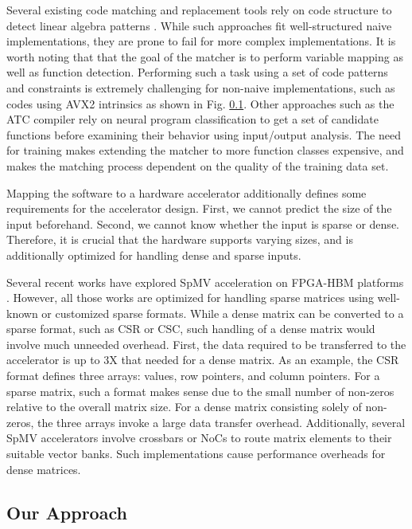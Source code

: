 \documentclass[manuscript,screen,review]{acmart}
\begin{document}
Several existing code matching and replacement tools rely on code structure to detect linear algebra patterns \cite{kernelfarer, IDL}. While such approaches fit well-structured naive implementations, they are prone to fail for more complex implementations. It is worth noting that that the goal of the matcher is to perform variable mapping as well as function detection. Performing such a task using a set of code patterns and constraints is extremely challenging for non-naive implementations, such as codes using AVX2 intrinsics as shown in Fig. \ref{}. Other approaches such as the ATC compiler \cite{ATC} rely on neural program classification \cite{cummins2021a} to get a set of candidate functions before examining their behavior using input/output analysis. The need for training makes extending the matcher to more function classes expensive, and makes the matching process dependent on the quality of the training data set.

Mapping the software to a hardware accelerator additionally defines some requirements for the accelerator design. First, we cannot predict the size of the input beforehand. Second, we cannot know whether the input is sparse or dense. Therefore, it is crucial that the hardware supports varying sizes, and is additionally optimized for handling dense and sparse inputs. 

Several recent works have explored SpMV acceleration on FPGA-HBM platforms \cite{hisparse, graphlily, fccm-spmv, serpens}. However, all those works are optimized for handling sparse matrices using well-known or customized sparse formats. While a dense matrix can be converted to a sparse format, such as CSR or CSC, such handling of a dense matrix would involve much unneeded overhead. First, the data required to be transferred to the accelerator is up to 3X that needed for a dense matrix. As an example, the CSR format defines three arrays: values, row pointers, and column pointers. For a sparse matrix, such a format makes sense due to the small number of non-zeros relative to the overall matrix size. For a dense matrix consisting solely of non-zeros, the three arrays invoke a large data transfer overhead. Additionally, several SpMV accelerators involve crossbars or NoCs to route matrix elements to their suitable vector banks. Such implementations cause performance overheads for dense matrices.

\subsection{Our Approach}
\end{document}
